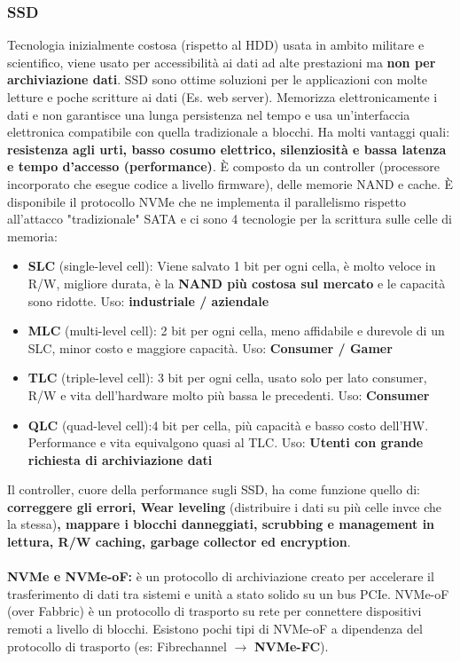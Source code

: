 \documentclass[8pt,a4paper]{extarticle}
\begin{document}
\begin{multicols*}{4}
		\subsubsection{SSD}
		Tecnologia inizialmente costosa (rispetto al HDD) usata in ambito militare e scientifico, viene usato per accessibilità ai dati ad alte prestazioni ma \textbf{non per archiviazione dati}. SSD sono ottime soluzioni per le applicazioni con molte letture e poche scritture ai dati (Es. web server). Memorizza elettronicamente i dati e non garantisce una lunga persistenza nel tempo e usa un'interfaccia elettronica compatibile con quella tradizionale a blocchi. Ha molti vantaggi quali: \textbf{resistenza agli urti, basso cosumo elettrico, silenziosità e bassa latenza e tempo d'accesso (performance)}. È composto da un controller (processore incorporato che esegue codice a livello firmware), delle memorie NAND e cache. È disponibile il protocollo NVMe che ne implementa il parallelismo rispetto all'attacco "tradizionale" SATA e ci sono 4 tecnologie per la scrittura sulle celle di memoria:
		\begin{itemize}
			\item \textbf{SLC} (single-level cell): Viene salvato 1 bit per ogni cella, è molto veloce in R/W, migliore durata, è la \textbf{NAND più costosa sul mercato} e le capacità sono ridotte. Uso: \textbf{industriale / aziendale}
			
			\item \textbf{MLC} (multi-level cell): 2 bit per ogni cella, meno affidabile e durevole di un SLC, minor costo e maggiore capacità. Uso: \textbf{Consumer / Gamer}
			
			\item \textbf{TLC} (triple-level cell): 3 bit per ogni cella, usato solo per lato consumer, R/W e vita dell'hardware molto più bassa le precedenti. Uso: \textbf{Consumer}
			
			\item \textbf{QLC} (quad-level cell):4 bit per cella, più capacità e basso costo dell'HW. Performance e vita equivalgono quasi al TLC. Uso: \textbf{Utenti con grande richiesta di archiviazione dati}
		\end{itemize}
Il controller, cuore della performance sugli SSD, ha come funzione quello di: \textbf{correggere gli errori, Wear leveling} (distribuire i dati su più celle invce che la stessa)\textbf{, mappare i blocchi danneggiati, scrubbing e management in lettura, R/W caching, garbage collector ed encryption}. 
\\ \\
\textbf{NVMe e NVMe-oF:} è un protocollo di archiviazione creato per accelerare il trasferimento di dati tra sistemi e unità a stato solido su un bus PCIe. NVMe-oF (over Fabbric) è un protocollo di trasporto su rete per connettere dispositivi remoti a livello di blocchi. Esistono pochi tipi di NVMe-oF a dipendenza del protocollo di trasporto (es: Fibrechannel $\to$ \textbf{NVMe-FC}).


\end{multicols*}
\end{document}

